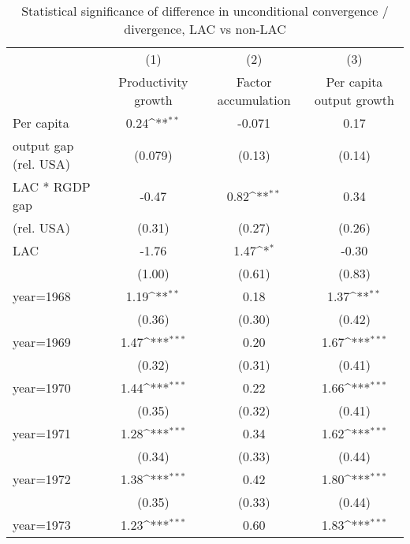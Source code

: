 \begin{table}[htbp]\centering
\def\sym#1{\ifmmode^{#1}\else\(^{#1}\)\fi}
\caption{Statistical significance of difference in unconditional convergence / divergence, LAC vs non-LAC}
\begin{tabular}{l*{3}{c}}
\toprule
                &\multicolumn{1}{c}{(1)}&\multicolumn{1}{c}{(2)}&\multicolumn{1}{c}{(3)}\\
                &\multicolumn{1}{c}{Productivity growth}&\multicolumn{1}{c}{Factor accumulation}&\multicolumn{1}{c}{Per capita output growth}\\
\midrule
Per capita      &     0.24\sym{**} &   -0.071         &     0.17         \\
output gap (rel. USA)&  (0.079)         &   (0.13)         &   (0.14)         \\
\addlinespace
LAC * RGDP gap  &    -0.47         &     0.82\sym{**} &     0.34         \\
(rel. USA)      &   (0.31)         &   (0.27)         &   (0.26)         \\
\addlinespace
LAC             &    -1.76         &     1.47\sym{*}  &    -0.30         \\
                &   (1.00)         &   (0.61)         &   (0.83)         \\
\addlinespace
year=1968       &     1.19\sym{**} &     0.18         &     1.37\sym{**} \\
                &   (0.36)         &   (0.30)         &   (0.42)         \\
\addlinespace
year=1969       &     1.47\sym{***}&     0.20         &     1.67\sym{***}\\
                &   (0.32)         &   (0.31)         &   (0.41)         \\
\addlinespace
year=1970       &     1.44\sym{***}&     0.22         &     1.66\sym{***}\\
                &   (0.35)         &   (0.32)         &   (0.41)         \\
\addlinespace
year=1971       &     1.28\sym{***}&     0.34         &     1.62\sym{***}\\
                &   (0.34)         &   (0.33)         &   (0.44)         \\
\addlinespace
year=1972       &     1.38\sym{***}&     0.42         &     1.80\sym{***}\\
                &   (0.35)         &   (0.33)         &   (0.44)         \\
\addlinespace
year=1973       &     1.23\sym{***}&     0.60         &     1.83\sym{***}\\

\end{tabular}
\end{table}
